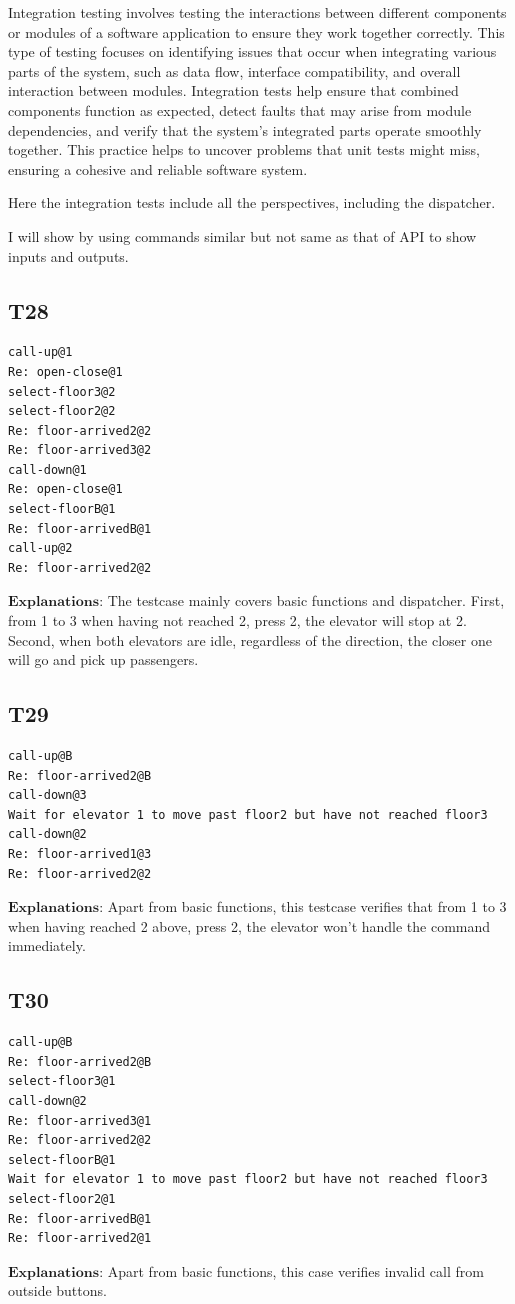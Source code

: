 \documentclass{article}
\begin{document}
Integration testing involves testing the interactions between different components or modules of a software application to ensure they work together correctly. This type of testing focuses on identifying issues that occur when integrating various parts of the system, such as data flow, interface compatibility, and overall interaction between modules. Integration tests help ensure that combined components function as expected, detect faults that may arise from module dependencies, and verify that the system's integrated parts operate smoothly together. This practice helps to uncover problems that unit tests might miss, ensuring a cohesive and reliable software system.

Here the integration tests include all the perspectives, including the dispatcher.

I will show by using commands similar but not same as that of API to show inputs and outputs.
\subsection*{T28}
\begin{lstlisting}
call-up@1
Re: open-close@1
select-floor3@2
select-floor2@2
Re: floor-arrived2@2
Re: floor-arrived3@2
call-down@1
Re: open-close@1
select-floorB@1
Re: floor-arrivedB@1
call-up@2
Re: floor-arrived2@2
\end{lstlisting}
$\textbf{Explanations:}$ The testcase mainly covers basic functions and dispatcher. First, from 1 to 3 when having not reached 2, press 2, the elevator will stop at 2.
Second, when both elevators are idle, regardless of the direction, the closer one will go and pick up passengers.

\subsection*{T29}
\begin{lstlisting}
call-up@B
Re: floor-arrived2@B
call-down@3
Wait for elevator 1 to move past floor2 but have not reached floor3
call-down@2
Re: floor-arrived1@3
Re: floor-arrived2@2
\end{lstlisting}
$\textbf{Explanations:}$ Apart from basic functions, this testcase verifies that from 1 to 3 when having reached 2 above, press 2, the elevator won't handle the command immediately.

\subsection*{T30}
\begin{lstlisting}
call-up@B
Re: floor-arrived2@B
select-floor3@1
call-down@2
Re: floor-arrived3@1
Re: floor-arrived2@2
select-floorB@1
Wait for elevator 1 to move past floor2 but have not reached floor3
select-floor2@1
Re: floor-arrivedB@1
Re: floor-arrived2@1  
\end{lstlisting}
$\textbf{Explanations:}$ Apart from basic functions, this case verifies invalid call from outside buttons.
\end{document}

